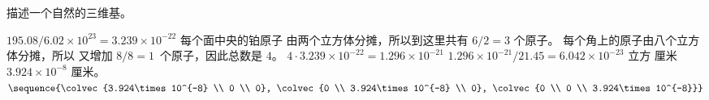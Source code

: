 \begin{exercises}
\begin{exparts}
      \partsitem 描述一个自然的三维基。
    \end{exparts}
    \begin{answer}
      \begin{exparts}
        \partsitem $195.08/6.02\times 10^{23}=3.239\times 10^{-22}$
        \partsitem 每个面中央的铂原子
          由两个立方体分摊，所以到这里共有 $6/2=3$ 个原子。
          每个角上的原子由八个立方体分摊，所以
          又增加 $8/8=1$~个原子，因此总数是 $4$。
        \partsitem $4\cdot 3.239\times 10^{-22}=1.296\times 10^{-21}$
        \partsitem $1.296\times 10^{-21}/21.45=6.042\times 10^{-23}$ 立方
           厘米
        \partsitem $3.924\times 10^{-8}$ 厘米。
        \partsitem 
            $\sequence{\colvec{3.924\times 10^{-8} \\ 0 \\ 0},
                       \colvec{0 \\ 3.924\times 10^{-8} \\ 0},
                       \colvec{0 \\ 0 \\ 3.924\times 10^{-8}}}$
      \end{exparts}
    \end{answer}
\end{exercises}
\endinput
